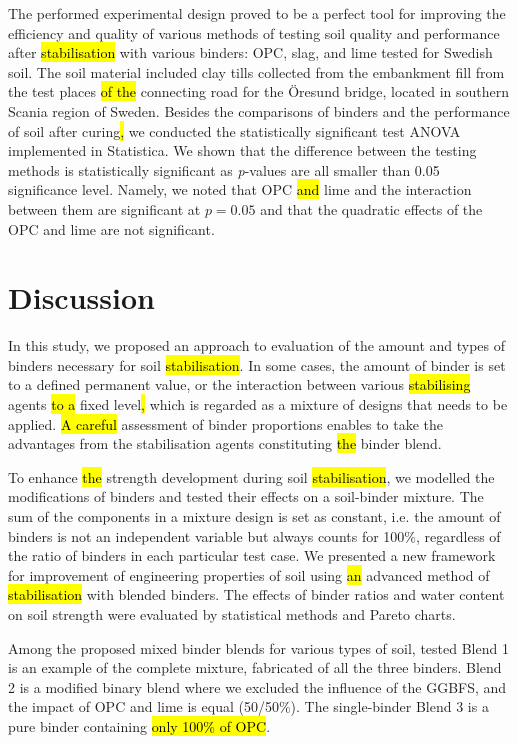 \documentclass[eprint,
]{actapoly}
\begin{document}
The performed experimental design proved to be a perfect tool for improving the efficiency and quality of various methods of testing soil quality and performance after \hl{stabilisation} with various binders: OPC, slag, and lime tested for Swedish soil. The soil material included clay tills collected from the embankment fill from the test places \hl{of the} connecting road for the Öresund bridge, located in southern Scania region of Sweden. Besides the comparisons of binders and the performance of soil after curing\hl{,} we conducted the statistically significant test ANOVA implemented in Statistica. We shown that the difference between the testing methods is statistically significant as \emph{p}-values are all smaller than 0.05 significance level. Namely, we noted that OPC \hl{and} lime and the interaction between them are significant at $p = 0.05$ and that the quadratic effects of the OPC and lime are not significant.

\section{Discussion}
In this study, we proposed an approach to evaluation of the amount and types of binders necessary for soil \hl{stabilisation}. In some cases, the amount of binder is set to a defined permanent value, or the interaction between various \hl{stabilising} agents \hl{to a} fixed level\hl{, }which is regarded as a mixture of designs that needs to be applied. \hl{A careful} assessment of binder proportions enables to take the advantages from the stabilisation agents constituting \hl{the} binder blend. 

To enhance \hl{the} strength development during soil \hl{stabilisation}, we modelled the modifications of binders and tested their effects on a soil-binder mixture. The sum of the components in a mixture design is set as constant, i.e.\hl{ }the amount of binders is not an independent variable but always counts for 100\%, regardless of the ratio of binders in each particular test case. We presented a new framework for improvement of engineering properties of soil using \hl{an} advanced method of \hl{stabilisation} with blended binders. The effects of binder ratios and water content on soil strength were evaluated by statistical methods and Pareto charts.

Among the proposed mixed binder blends for various types of soil, tested Blend 1 is an example of the complete mixture, fabricated of all the three binders. Blend 2 is a modified binary blend where we excluded the influence of the GGBFS, and the impact of OPC and lime is equal (50/50\%). The single-binder Blend 3 is a pure binder containing \hl{only 100\% of OPC}. 
\end{document}
